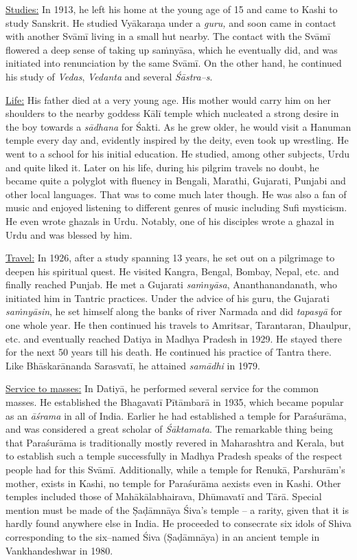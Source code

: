 \underline{Studies:} In 1913, he left his home at the young age of 15 and came to Kashi to study Sanskrit. He studied Vyākaraṇa under a \textit{guru,} and soon came in contact with another Svāmī living in a small hut nearby. The contact with the Svāmī flowered a deep sense of taking up saṁnyāsa, which he eventually did, and was initiated into renunciation by the same Svāmī. On the other hand, he continued his study of \textit{Vedas}, \textit{Vedanta} and several \textit{Śāstra–s}.

\underline{Life:} His father died at a very young age. His mother would carry him on her shoulders to the nearby goddess Kālī temple which nucleated a strong desire in the boy towards a \textit{sādhana} for Śakti. As he grew older, he would visit a Hanuman temple every day and, evidently inspired by the deity, even took up wrestling. He went to a school for his initial education. He studied, among other subjects, Urdu and quite liked it. Later on his life, during his pilgrim travels no doubt, he became quite a polyglot with fluency in Bengali, Marathi, Gujarati, Punjabi and other local languages. That was to come much later though. He was also a fan of music and enjoyed listening to different genres of music including Sufi mysticism. He even wrote ghazals in Urdu. Notably, one of his disciples wrote a ghazal in Urdu and was blessed by him.

\underline{Travel:} In 1926, after a study spanning 13 years, he set out on a pilgrimage to deepen his spiritual quest. He visited Kangra, Bengal, Bombay, Nepal, etc. and finally reached Punjab. He met a Gujarati \textit{saṁnyāsa}, Ananthanandanath, who initiated him in Tantric practices. Under the advice of his guru, the Gujarati \textit{saṁnyāsin}, he set himself along the banks of river Narmada and did \textit{tapasyā} for one whole year. He then continued his travels to Amritsar, Tarantaran, Dhaulpur, etc. and eventually reached Datiya in Madhya Pradesh in 1929. He stayed there for the next 50 years till his death. He continued his practice of Tantra there. Like Bhāskarānanda Sarasvatī, he attained \textit{samādhi} in 1979.

\underline{Service to masses:} In Datiyā, he performed several service for the common masses. He established the Bhagavatī Pītāmbarā in 1935, which became popular as an \textit{āśrama} in all of India. Earlier he had established a temple for Paraśurāma, and was considered a great scholar of \textit{Śāktamata}. The remarkable thing being that Paraśurāma is traditionally mostly revered in Maharashtra and Kerala, but to establish such a temple successfully in Madhya Pradesh speaks of the respect people had for this Svāmī. Additionally, while a temple for Renukā, Parshurām’s mother, exists in Kashi, no temple for Paraśurāma aexists even in Kashi. Other temples included those of Mahākālabhairava, Dhūmavatī and Tārā. Special mention must be made of the Ṣaḍāmnāya Śiva’s temple – a rarity, given that it is hardly found anywhere else in India. He proceeded to consecrate six idols of Shiva corresponding to the six–named Śiva (Ṣaḍāmnāya) in an ancient temple in Vankhandeshwar in 1980.

